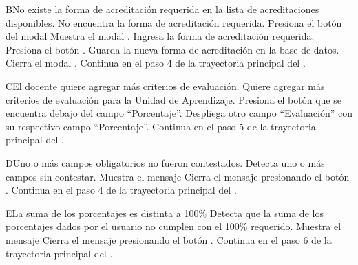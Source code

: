 
\begin{UCtrayectoriaA}{B}{No existe la forma de acreditación requerida en la lista de acreditaciones disponibles.}
    \UCpaso[\UCactor] No encuentra la forma de acreditación requerida.
    \UCpaso[\UCactor] Presiona el botón  del modal 
    \UCpaso Muestra el modal .
    \UCpaso[\UCactor] Ingresa la forma de acreditación requerida.
    \UCpaso[\UCactor] Presiona el botón .
    \UCpaso Guarda la nueva forma de acreditación en la base de datos.
    \UCpaso Cierra el modal .
    \UCpaso Continua en el paso 4 de la trayectoria principal del .
\end{UCtrayectoriaA}




\begin{UCtrayectoriaA}{C}{El docente quiere agregar más criterios de evaluación.}
    \UCpaso[\UCactor] Quiere agregar más criterios de evaluación para la Unidad de Aprendizaje.
    \UCpaso[\UCactor] Presiona el botón  que se encuentra debajo del campo ``Porcentaje''.
    \UCpaso Despliega otro campo ``Evaluación'' con su respectivo campo ``Porcentaje''.
    \UCpaso Continua en el paso 5 de la trayectoria principal del .
\end{UCtrayectoriaA}



\begin{UCtrayectoriaA}{D}{Uno o más campos obligatorios no fueron contestados.}
    \UCpaso Detecta uno o más campos sin contestar.
    \UCpaso Muestra el mensaje 
    \UCpaso[\UCactor] Cierra el mensaje presionando el botón .
    \UCpaso Continua en el paso 4 de la trayectoria principal del .
\end{UCtrayectoriaA}



\begin{UCtrayectoriaA}{E}{La suma de los porcentajes es distinta a 100\%}
    \UCpaso Detecta que la suma de los porcentajes dados por el usuario no cumplen con el 100\% requerido.
    \UCpaso Muestra el mensaje 
    \UCpaso[\UCactor] Cierra el mensaje presionando el botón .
    \UCpaso Continua en el paso 6 de la trayectoria principal del .
\end{UCtrayectoriaA}

